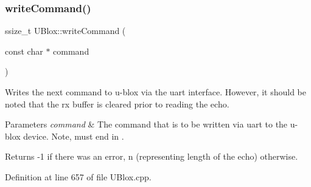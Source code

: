 \subsubsection{\texorpdfstring{write\+Command()}{writeCommand()}}
{\footnotesize\ttfamily ssize\+\_\+t U\+Blox\+::write\+Command (\begin{DoxyParamCaption}\item[{const char $\ast$}]{command }\end{DoxyParamCaption})\hspace{0.3cm}{\ttfamily [private]}}

Writes the next command to u-\/blox via the uart interface. However, it should be noted that the rx buffer is cleared prior to reading the echo.


\begin{DoxyParams}{Parameters}
{\em command} & The command that is to be written via uart to the u-\/blox device. Note, must end in . \\
\hline
\end{DoxyParams}
\begin{DoxyReturn}{Returns}
-\/1 if there was an error, n (representing length of the echo) otherwise. 
\end{DoxyReturn}


Definition at line 657 of file U\+Blox.\+cpp.


